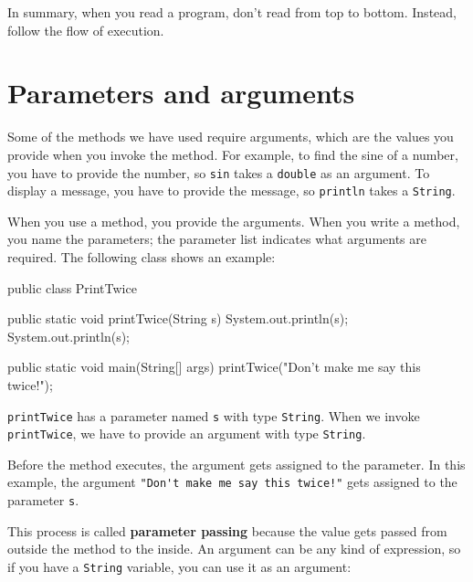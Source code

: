 \documentclass[12pt]{book}
\theoremstyle{exercise}
\newcommand{\java}[1]{\verb"#1"}
\begin{document}
In summary, when you read a program, don't read from top to bottom.
Instead, follow the flow of execution.



\section{Parameters and arguments}


Some of the methods we have used require arguments, which are the values you provide when you invoke the method.
For example, to find the sine of a number, you have to provide the number, so \java{sin} takes a \java{double} as an argument.
To display a message, you have to provide the message, so \java{println} takes a \java{String}.

When you use a method, you provide the arguments.
When you write a method, you name the parameters; the parameter list indicates what arguments are required.
The following class shows an example:

\begin{code}
public class PrintTwice {

    public static void printTwice(String s) {
        System.out.println(s);
        System.out.println(s);
    }

    public static void main(String[] args) {
        printTwice("Don't make me say this twice!");
    }
}
\end{code}

\java{printTwice} has a parameter named \java{s} with type \java{String}.
When we invoke \java{printTwice}, we have to provide an argument with type \java{String}.

Before the method executes, the argument gets assigned to the parameter.
In this example, the argument \verb|"Don't make me say this twice!"| gets assigned to the parameter \java{s}.


This process is called {\bf parameter passing} because the value gets passed from outside the method to the inside.
An argument can be any kind of expression, so if you have a \java{String} variable, you can use it as an argument:
\end{document}
